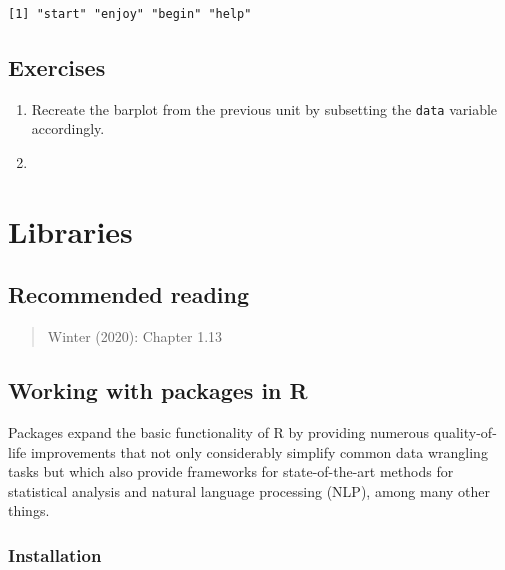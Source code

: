 \documentclass[
  11pt,
  letterpaper,
  DIV=11,
  numbers=noendperiod]{scrreprt}
\newenvironment{Shaded}{\begin{snugshade}}{\end{snugshade}}
\newcommand{\NormalTok}[1]{\textcolor[rgb]{0.00,0.23,0.31}{#1}}
\newcommand{\SpecialCharTok}[1]{\textcolor[rgb]{0.37,0.37,0.37}{#1}}
\begin{document}
\begin{Shaded}
\end{Shaded}

\begin{verbatim}
[1] "start" "enjoy" "begin" "help" 
\end{verbatim}

\section{Exercises}\label{exercises-1}

\begin{enumerate}
\def\labelenumi{\arabic{enumi}.}
\item
  Recreate the barplot from the previous unit by subsetting the
  \texttt{data} variable accordingly.
\item
\end{enumerate}

\chapter{Libraries}\label{libraries}

\section{Recommended reading}\label{recommended-reading-2}

\begin{quote}
Winter (2020): Chapter 1.13
\end{quote}

\section{Working with packages in R}\label{working-with-packages-in-r}

Packages expand the basic functionality of R by providing numerous
quality-of-life improvements that not only considerably simplify common
data wrangling tasks but which also provide frameworks for
state-of-the-art methods for statistical analysis and natural language
processing (NLP), among many other things.

\subsection{Installation}\label{installation}
\end{document}
